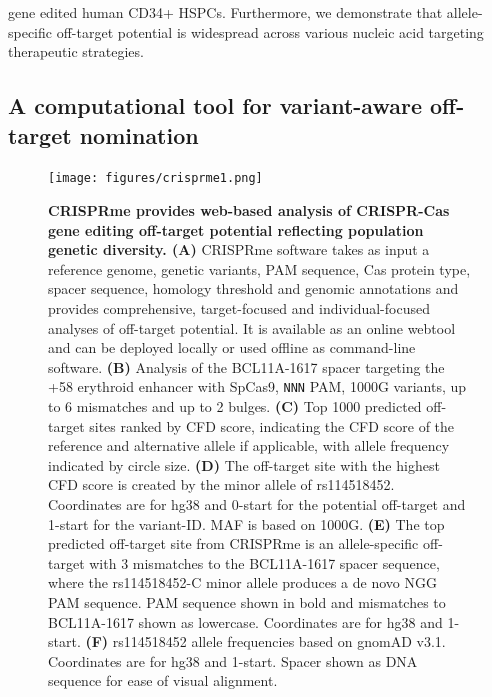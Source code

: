 \documentclass[a4paper, titlepage, openright]{book}
\begin{document}
gene edited human CD34+ HSPCs. Furthermore, we demonstrate that allele-specific off-target potential is widespread across various nucleic acid targeting therapeutic strategies.
\subsection{A computational tool for variant-aware off-target nomination}
\begin{figure}
	\centering
	\texttt{[image: figures/crisprme1.png]}
	\caption[CRISPRme provides web-based analysis of CRISPR-Cas gene editing off-target potential reflecting population genetic diversity]{\textbf{CRISPRme provides web-based analysis of CRISPR-Cas gene editing off-target potential reflecting population genetic diversity. (A)} CRISPRme software takes as input a reference genome, genetic variants, PAM sequence, Cas protein type, spacer sequence, homology threshold and genomic annotations and provides comprehensive, target-focused and individual-focused analyses of off-target potential. It is available as an online webtool and can be deployed locally or used offline as command-line software. \textbf{(B)} Analysis of the BCL11A-1617 spacer targeting the +58 erythroid enhancer with SpCas9, \texttt{NNN} PAM, 1000G variants, up to 6 mismatches and up to 2 bulges. \textbf{(C)} Top 1000 predicted off-target sites ranked by CFD score, indicating the CFD score of the reference and alternative allele if applicable, with allele frequency indicated by circle size. \textbf{(D)} The off-target site with the highest CFD score is created by the minor allele of rs114518452. Coordinates are for hg38 and 0-start for the potential off-target and 1-start for the variant-ID. MAF is based on 1000G. \textbf{(E)} The top predicted off-target site from CRISPRme is an allele-specific off-target with 3 mismatches to the BCL11A-1617 spacer sequence, where the rs114518452-C minor allele produces a de novo NGG PAM sequence. PAM sequence shown in bold and mismatches to BCL11A-1617 shown as lowercase. Coordinates are for hg38 and 1-start. \textbf{(F)} rs114518452 allele frequencies based on gnomAD v3.1. Coordinates are for hg38 and 1-start. Spacer shown as DNA sequence for ease of visual alignment.}
	\label{fig:crisprme1}
\end{figure} 
\end{document}
